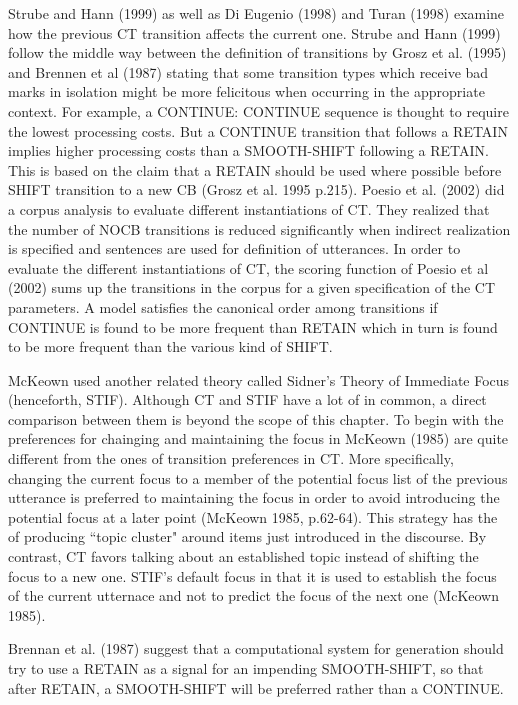 Strube and Hann (1999) as well as Di Eugenio (1998) and Turan (1998) examine how the previous CT transition affects the current one. Strube and Hann (1999) follow the middle way between the definition of transitions by Grosz et al. (1995) and Brennen et al (1987) stating that some transition types which receive bad marks in isolation might be more felicitous when occurring in the appropriate context. 
For example, a CONTINUE: CONTINUE sequence is thought to require the lowest processing costs. 
But a CONTINUE transition that follows a RETAIN implies higher processing costs than a SMOOTH-SHIFT following a RETAIN. 
This is based on the claim that a RETAIN should be used where possible before SHIFT transition to a new CB (Grosz et al. 1995 p.215). 
Poesio et al. (2002) did a corpus analysis to evaluate different instantiations of CT.
They realized that the number of NOCB transitions is reduced significantly when indirect realization is specified and sentences are used for definition of utterances. 
In order to evaluate the different instantiations of CT, the scoring function of Poesio et al (2002) sums up the transitions in the corpus for a given specification of the CT parameters. 
A model satisfies the canonical order among transitions if CONTINUE is found to be more frequent than RETAIN which in turn is found to be more frequent than the various kind of SHIFT. 

McKeown used another related theory called Sidner's Theory of Immediate Focus (henceforth, STIF). 
Although CT and STIF have a lot of in common, a direct comparison between them is beyond the scope of this chapter. 
To begin with the preferences for chainging and maintaining the focus in McKeown (1985) are quite different from the ones of transition preferences in CT. 
More specifically, changing the current focus to a member of the potential focus list of the previous utterance is preferred to maintaining the focus in order to avoid introducing the potential focus at a later point (McKeown 1985, p.62-64). 
This strategy has the of producing ``topic cluster" around items just introduced in the discourse. 
By contrast, CT favors talking about an established topic instead of shifting the focus to a new one. 
STIF's default focus in that it is used to establish the focus of the current utternace and not to predict the focus of the next one (McKeown 1985). 

Brennan et al. (1987) suggest that a computational system for generation should try to use a RETAIN as a signal for an impending SMOOTH-SHIFT, so that after RETAIN, a SMOOTH-SHIFT will be preferred rather than a CONTINUE. 

